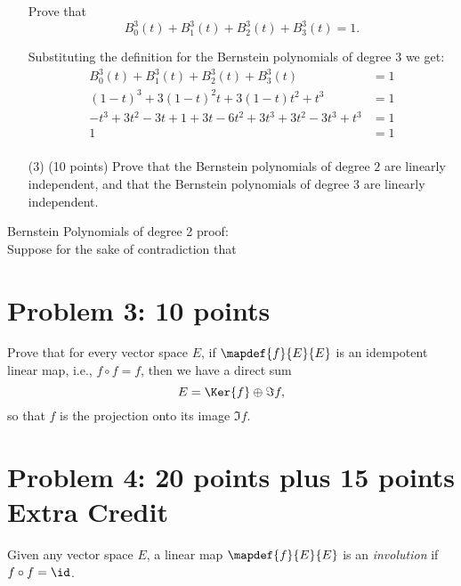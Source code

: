 \documentclass[12pt]{article}
\begin{document}
\begin{itemize}
Prove that
\[
B_0^3(t) +  B_1^3(t) +  B_2^3(t) + B_3^3(t) = 1.
\]

Substituting the definition for the Bernstein polynomials of degree 3 we get:
\begin{align*}
    B_0^3(t) +  B_1^3(t) +  B_2^3(t) + B_3^3(t) &= 1 \\
    (1 - t)^3 + 3(1 - t)^2t + 3(1 - t)t^2 + t^3 &= 1 \\
    -t^3 + 3t^2 - 3t + 1 + 3t - 6t^2 + 3t^3+ 3t^2 - 3t^3 + t^3 &= 1 \\
    1 &= 1 \\
\end{align*}

\item[(3)](10 points)
Prove that the Bernstein polynomials of degree $2$
are linearly independent, and that
the Bernstein polynomials of degree $3$
are linearly independent.
 \end{itemize}

Bernstein Polynomials of degree 2 proof: \\
Suppose for the sake of contradiction that 

\section*{Problem 3: 10 points}
\label{prob-5.2}
Prove that 
for every vector space $E$, if $\mapdef{f}{E}{E}$ is an idempotent
linear map, i.e., $f\circ f = f$, then we have a direct sum
\[
E = \Ker{f} \oplus \Im{f},
\]
so that $f$ is the projection onto its image $\Im{f}$.


\section*{Problem 4: 20 points plus 15 points Extra Credit}
\label{prob-5.5}
Given any vector space $E$, a linear map  $\mapdef{f}{E}{E}$  is an
{\it involution\/} if  $f\circ f = \id$.
\end{document}
